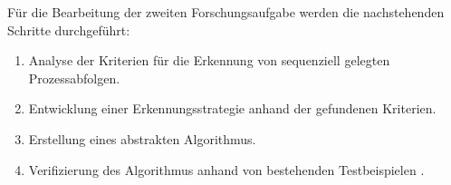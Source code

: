 Für die Bearbeitung der zweiten Forschungsaufgabe werden die nachstehenden Schritte durchgeführt:
\begin{enumerate}
	\item Analyse der Kriterien für die Erkennung von sequenziell gelegten Prozessabfolgen.
	\item Entwicklung einer Erkennungsstrategie anhand der gefundenen Kriterien.
	\item Erstellung eines abstrakten Algorithmus.
	\item Verifizierung des Algorithmus anhand von bestehenden Testbeispielen \cite{max}.
\end{enumerate}


